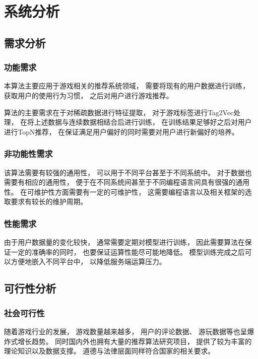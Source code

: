 \section{系统分析}

\subsection{需求分析}

\subsubsection{功能需求}

本算法主要应用于游戏相关的推荐系统领域，
需要将现有的用户数据进行训练，
获取用户的使用行为习惯，
之后对用户进行游戏推荐。

算法的主要需求在于对稀疏数据进行特征提取，
对于游戏标签进行Tag2Vec处理，
在将上述数据与连续数据相结合后进行训练，
在训练结果足够好之后对用户进行TopN推荐，
在保证满足用户偏好的同时需要对用户进行新偏好的培养。

\subsubsection{非功能性需求}

该算法需要有较强的通用性，
可以用于不同平台甚至于不同系统中。
对于数据也需要有相应的通用性，
便于在不同系统间甚至于不同编程语言间具有很强的通用性。
在可维护性方面需要有一定的可维护性，
这需要编程语言以及相关框架的选取要求有较长的维护周期。

\subsubsection{性能需求}

由于用户数据量的变化较快，
通常需要定期对模型进行训练，
因此需要算法在保证一定的准确率的同时，
也要保证运算性能尽可能地降低。
模型训练完成之后可以方便地嵌入不同平台中，
以降低服务端运算压力。

\subsection{可行性分析}

\subsubsection{社会可行性}

随着游戏行业的发展，
游戏数量越来越多，
用户的评论数据、
游玩数据等也呈爆炸式增长趋势。
同时国内外也拥有大量的推荐算法研究项目，
提供了较为丰富的理论知识以及数据支撑。
道德与法律层面同样符合国家的相关要求。

